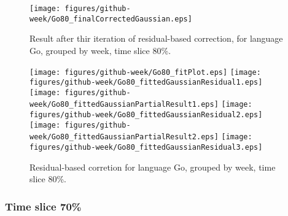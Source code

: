 \begin{figure}[]
\centering
{\texttt{[image: figures/github-week/Go80\_finalCorrectedGaussian.eps]}}
\caption{Result after thir iteration of residual-based correction, for language Go, grouped by week, time slice 80\%.}
\end{figure}


\begin{figure}[hb]
\centering
{}
{\texttt{[image: figures/github-week/Go80\_fitPlot.eps]}}
{\texttt{[image: figures/github-week/Go80\_fittedGaussianResidual1.eps]}}
{\texttt{[image: figures/github-week/Go80\_fittedGaussianPartialResult1.eps]}}
{\texttt{[image: figures/github-week/Go80\_fittedGaussianResidual2.eps]}}
{\texttt{[image: figures/github-week/Go80\_fittedGaussianPartialResult2.eps]}}
{\texttt{[image: figures/github-week/Go80\_fittedGaussianResidual3.eps]}}
\caption{Residual-based corretion for language Go, grouped by week, time slice 80\%.}
\end{figure}


\clearpage 
\newpage 


\FloatBarrier

\subsubsection{Time slice 70\%}


